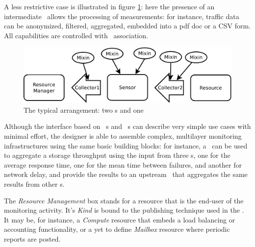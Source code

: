 \documentclass[12pt]{article}  %
\begin{document}
A less restrictive case is illustrated in figure \ref{fig:twostages}: here the presence of an intermediate \sens\ allows the processing of measurements: for instance, traffic data can be anonymized, filtered, aggregated, embedded into a pdf doc or a CSV form. All capabilities are controlled with \mi\ association.

\begin{figure}
\centering
\includegraphics[width=0.7 \linewidth]{twostages.pdf}
\caption{The typical arrangement: two \coll s and one \sens \label{fig:twostages}}
\end{figure}

Although the interface based on \sens\ s and \coll\ s can describe very simple use cases with minimal effort, the designer is able to assemble complex, multilayer monitoring infrastructures using the same basic building blocks: for instance, a \sens\ can be used to aggregate a storage throughput using the input from three \coll s, one for the average response time, one for the mean time between failures, and another for network delay, and provide the results to an upstream \sens\ that aggregates the same results from other \sens s.

The {\em Resource Management} box stands for a resource that is the end-user of the monitoring activity. It's {\em Kind} is bound to the publishing technique used in the \coll . It may be, for instance, a {\em Compute} resource that embeds a load balancing or accounting functionality, or a yet to define {\em Mailbox} resource where periodic reports are posted. 

\end{document}
